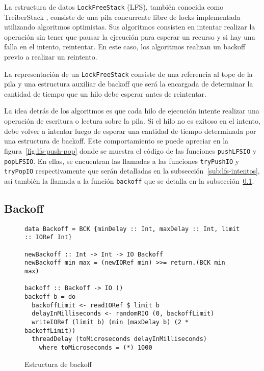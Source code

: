 La estructura de datos \texttt{LockFreeStack} (LFS), también conocida como TreiberStack \cite{treiber}, consiste de una pila concurrente libre de locks implementada utilizando algoritmos optimistas. Sus algoritmos consisten en intentar realizar la operación sin tener que pausar la ejecución para esperar un recurso y si hay una falla en el intento, reintentar. En este caso, los algoritmos realizan un backoff previo a realizar un reintento.

La representación de un \texttt{LockFreeStack} consiste de una referencia al tope de la pila y una estructura auxiliar de backoff que será la encargada de determinar la cantidad de tiempo que un hilo debe esperar antes de reintentar.

La idea detrás de los algoritmos es que cada hilo de ejecución intente realizar una operación de escritura o lectura sobre la pila. Si el hilo no es exitoso en el intento, debe volver a intentar luego de esperar una cantidad de tiempo determinada por una estructura de backoff. Este comportamiento se puede apreciar en la figura~\ref{fig:lfs-push-pop} donde se muestra el código de las funciones \texttt{pushLFSIO} y \texttt{popLFSIO}. En ellas, se encuentran las llamadas a las funciones \texttt{tryPushIO} y \texttt{tryPopIO} respectivamente que serán detalladas en la subsección~\ref{sub:lfs-intentos}, así también la llamada a la función \texttt{backoff} que se detalla en la subsección~\ref{sub:backoff}.

\subsection{Backoff}\label{sub:backoff}

\begin{figure}[t]
  \begin{verbatim}
data Backoff = BCK {minDelay :: Int, maxDelay :: Int, limit :: IORef Int}

newBackoff :: Int -> Int -> IO Backoff
newBackoff min max = (newIORef min) >>= return.(BCK min max)

backoff :: Backoff -> IO ()
backoff b = do
  backoffLimit <- readIORef $ limit b
  delayInMilliseconds <- randomRIO (0, backoffLimit)
  writeIORef (limit b) (min (maxDelay b) (2 * backoffLimit))
  threadDelay (toMicroseconds delayInMilliseconds)
    where toMicroseconds = (*) 1000
  \end{verbatim}
  \caption{Estructura de backoff}
  \label{fig:backoff-code}
\end{figure}

